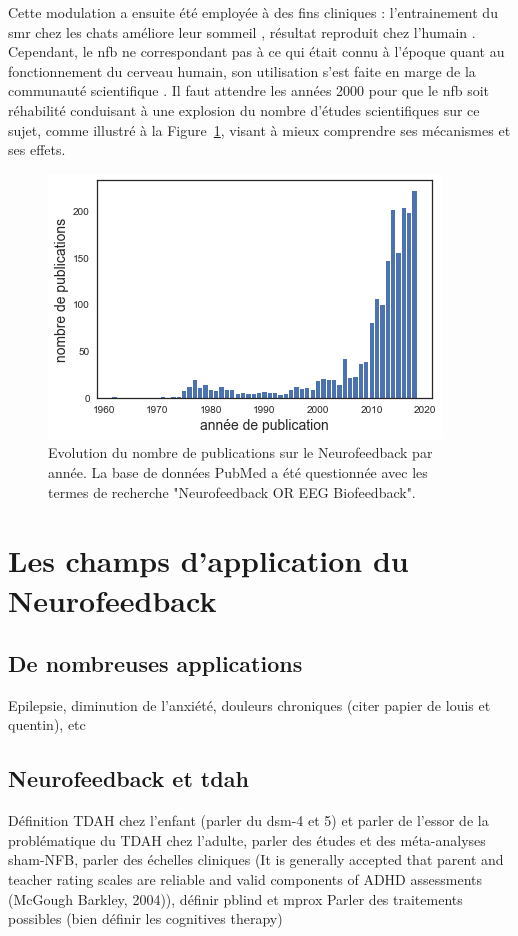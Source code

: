 Cette modulation a ensuite été employée à des fins cliniques : l'entrainement du \gls{smr} chez les chats améliore leur sommeil \citep{Sterman1970},
résultat reproduit chez l'humain \citep{Hoedlmoser2008}. Cependant, le \gls{nfb} ne correspondant pas à ce qui était connu à l'époque quant au fonctionnement
du cerveau humain, son utilisation s'est faite en marge de la communauté scientifique \citep{Masterpasqua2003}. Il faut attendre les années 2000 pour que le 
\gls{nfb} soit réhabilité conduisant à une explosion du nombre d'études scientifiques sur ce sujet, comme illustré à la 
Figure~\ref{Figure:introduction_number_of_nfb_publications}, visant à mieux comprendre ses mécanismes et ses effets. 

\begin{figure}[h!]
  \centering
	\includegraphics[width=0.7\linewidth]{figures/chapter-1/introduction-number-of-nfb-publications} 
  \caption{Evolution du nombre de publications sur le Neurofeedback par année. La base de données PubMed a été questionnée avec les 
	termes de recherche "Neurofeedback OR EEG Biofeedback".}
  \label{Figure:introduction_number_of_nfb_publications}
\end{figure}

\section{Les champs d'application du Neurofeedback}

\subsection{De nombreuses applications}
Epilepsie, diminution de l’anxiété, douleurs chroniques (citer papier de louis et quentin), etc

\subsection{Neurofeedback et \gls{tdah}}
Définition TDAH chez l’enfant (parler du dsm-4 et 5) et parler de l’essor de la problématique du TDAH chez l’adulte, parler des études et des méta-analyses
sham-NFB, parler des échelles cliniques (It is generally accepted that parent and teacher rating scales are reliable and 
valid components of ADHD assessments (McGough  Barkley, 2004)), définir pblind et mprox
Parler des traitements possibles (bien définir les cognitives therapy)

